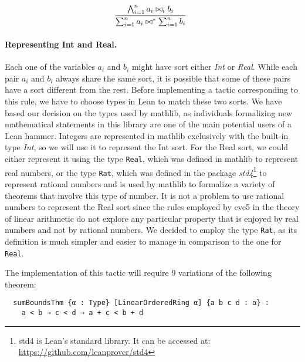\[
  \infer[]{\sum_{i = 1}^{n} a_{i} \bowtie^{*} \sum_{i = 1}^{n} b_{i}}{\bigwedge_{i = 1}^{n} a_{i} \bowtie_{i} b_{i}}
\]

\paragraph{Representing Int and Real.} Each one of the variables $a_{i}$ and $b_{i}$ might
have sort either \textit{Int} or \textit{Real}.
While each pair $a_{i}$ and $b_{i}$ always share the same sort, it is possible that some of these pairs have a sort different from the rest. Before implementing a
tactic corresponding to this rule, we have to choose types in Lean to match
these two sorts. We have based our decision on the types used by mathlib, as
individuals formalizing new mathematical statements in this library are one of the main potential users
of a Lean hammer. Integers are represented in mathlib exclusively with the built-in type \textit{Int}, so we will use it to represent the Int sort.
For the Real sort, we could either represent it using the type \texttt{Real}, which was defined in mathlib
to represent real numbers, or the type \texttt{Rat}, which was defined in the package \textit{std4}\footnote{std4 is Lean's standard library. It can be accessed at: \url{https://github.com/leanprover/std4}} to
represent rational numbers and is used by mathlib to formalize a variety of theorems
that involve this type of number.
It is not a problem to use rational numbers to represent the Real sort since the rules employed by cvc5 in the theory of linear arithmetic
do not explore any particular property that is enjoyed by real numbers and not by
rational numbers.
We decided to employ the type \texttt{Rat}, as its definition is much simpler and easier
to manage in comparison to the one for \texttt{Real}.

The implementation of this tactic will require 9 variations of the following theorem:

\begin{verbatim}
  sumBoundsThm {α : Type} [LinearOrderedRing α] {a b c d : α} :
    a < b → c < d → a + c < b + d
\end{verbatim}

